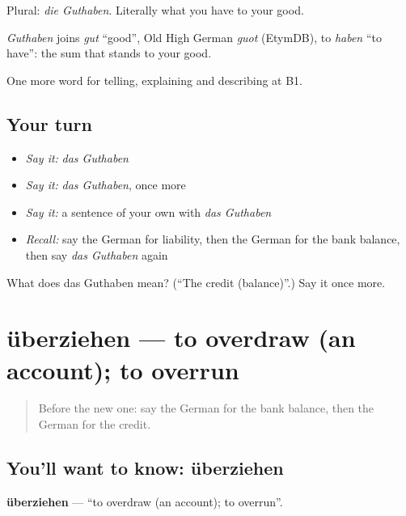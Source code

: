 Plural: \emph{die Guthaben}. Literally what you have to your good.

\begin{cousinweb}
\emph{Guthaben} joins \emph{gut} \textquotedblleft{}good\textquotedblright{}, Old High German \emph{guot} (EtymDB), to \emph{haben} \textquotedblleft{}to have\textquotedblright{}: the sum that stands to your good.
\end{cousinweb}

\begin{grammarlens}[title={What you've built}]
One more word for telling, explaining and describing at B1.
\end{grammarlens}

\subsection*{Your turn}
\begin{itemize}
\raggedright
  \item \emph{Say it:} \emph{das Guthaben}
  \item \emph{Say it:} \emph{das Guthaben}, once more
  \item \emph{Say it:} a sentence of your own with \emph{das Guthaben}
  \item \emph{Recall:} say the German for liability, then the German for the bank balance, then say \emph{das Guthaben} again
\end{itemize}

\begin{tcolorbox}[breakable,colback=teal!4,colframe=teal!35!black,title={Before you move on}]
What does das Guthaben mean? (\textquotedblleft{}The credit (balance)\textquotedblright{}.) Say it once more.
\end{tcolorbox}
\section[überziehen]{überziehen — to overdraw (an account); to overrun}

\label{lesson:GE-C387-ueberziehen}



\begin{quote}
Before the new one: say the German for the bank balance, then the German for the credit.
\end{quote}

\subsection*{You'll want to know: überziehen}
\textbf{überziehen} — \textquotedblleft{}to overdraw (an account); to overrun\textquotedblright{}.

